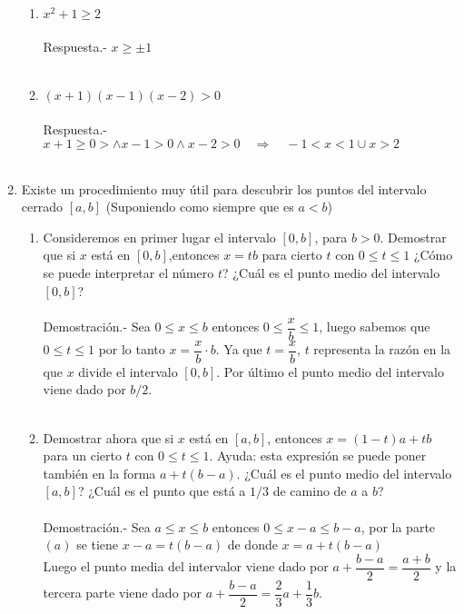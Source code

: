 \begin{enumerate}[\bfseries 1.]
\begin{enumerate}[\bfseries (i)]
	\item $x^2+1 \geq 2$\\\\
	    Respuesta.-\; $x\geq \pm 1$\\\\

	\item $(x+1)(x-1)(x-2)>0$\\\\
	    Respuesta.-\; $x+1\geq 0 > \land x-1 > 0  \land x-2>0 \quad \Longrightarrow \quad -1<x<1 \cup x>2$\\\\

    \end{enumerate}

    \item Existe un procedimiento muy útil para descubrir los puntos del intervalo cerrado $[a,b]$ (Suponiendo como siempre que es $a<b$)
    \begin{enumerate}[\bfseries (a)]
	
	\item Consideremos en primer lugar el intervalo $[0,b]$, para $b>0$. Demostrar que si $x$ está en $[0,b]$,entonces $x=tb$ para cierto $t$ con $0\leq t \leq 1$ ¿Cómo se puede interpretar el número $t$? ¿Cuál es el punto medio del intervalo $[0,b]$?\\\\
	    Demostración.-\; Sea $0\leq x \leq b$ entonces $0\leq \dfrac{x}{b} \leq 1$, luego sabemos que $0\leq t \leq 1$ por lo tanto $x=\dfrac{x}{b}\cdot b$. Ya que $t=\dfrac{x}{b}$, $t$ representa la razón en la que $x$ divide el intervalo $[0,b]$. Por último el punto medio del intervalo viene dado por $b/2$.\\\\

	\item Demostrar ahora que si $x$ está en $[a,b]$, entonces $x=(1-t)a+tb$ para un cierto $t$ con $0\leq t \leq 1.$ Ayuda: esta expresión se puede poner también en la forma $a+t(b-a).$ ¿Cuál es el punto medio del intervalo $[a,b]$? ¿Cuál es el punto que está a $1/3$ de camino de $a$ a $b$?\\\\
	    Demostración.-\; Sea $a\leq x \leq b$ entonces $0\leq x-a \leq b-a$, por la parte $(a)$ se tiene  $x-a=t(b-a)$ de donde $x=a+t(b-a)$\\
	    Luego el punto media del intervalor viene dado por $a+\dfrac{b-a}{2}=\dfrac{a+b}{2}$ y la tercera parte viene dado por $a+\dfrac{b-a}{2}=\dfrac{2}{3}a + \dfrac{1}{3}b.$\\\\


\end{enumerate}
\end{enumerate}
